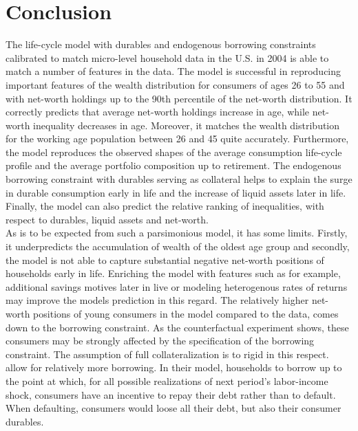 \documentclass[a4paper,12pt,legno]{article}
\begin{document}
\section{Conclusion}
\label{conclusion}
The life-cycle model with durables and endogenous borrowing constraints calibrated to match micro-level household data in the U.S. in 2004 is able to match a number of features in the data. The model is successful in reproducing important features of the wealth distribution for consumers of ages 26 to 55 and with net-worth holdings up to the 90th percentile of the net-worth distribution. It correctly predicts that average net-worth holdings increase in age, while net-worth inequality decreases in age. Moreover, it matches the wealth distribution for the working age population between 26 and 45 quite accurately. Furthermore, the model reproduces the observed shapes of the average consumption life-cycle profile and the average portfolio composition up to retirement. The endogenous borrowing constraint with durables serving as collateral helps to explain the surge in durable consumption early in life and the increase of liquid assets later in life. Finally, the model can also predict the relative ranking of inequalities, with respect to durables, liquid assets and net-worth. \\
As is to be expected from such a parsimonious model, it has some limits. Firstly, it underpredicts the accumulation of wealth of the oldest age group and secondly, the model is not able to capture substantial negative net-worth positions of households early in life. Enriching the model with features such as for example, additional savings motives later in live \citep{de2004wealth} or modeling heterogenous rates of returns \citep{benhabib2011distribution} may improve the models prediction in this regard. The relatively higher net-worth positions of young consumers in the model compared to the data, comes down to the borrowing constraint. As the counterfactual experiment shows, these consumers may be strongly affected by the specification of the borrowing constraint. The assumption of full collateralization is to rigid in this respect. \cite{FV&K2011} allow for relatively more borrowing. In their model, households to borrow up to the point at which, for all possible realizations of next period's labor-income shock, consumers  have an incentive to repay their debt rather than to default. When defaulting, consumers would loose all their debt, but also their consumer durables.


\end{document}
